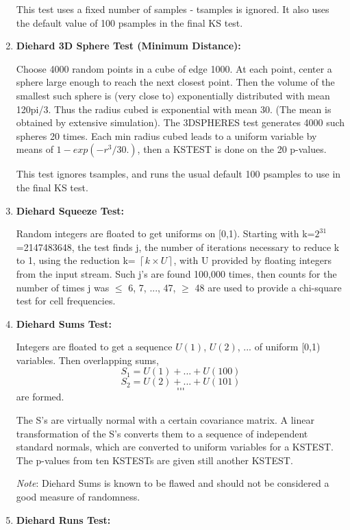\documentclass[titlepage, 11pt]{article}
\newcommand{\ceil}[1]{\left\lceil #1 \right\rceil}
\begin{document}
\begin{enumerate}
This test uses a fixed number of samples - tsamples is ignored.
It also uses the default value of 100 psamples in the final
KS test.


\item {\textbf{Diehard 3D Sphere Test (Minimum Distance):}}


Choose  4000 random points in a cube of edge 1000.  At each   
point, center a sphere large enough to reach the next closest 
point. Then the volume of the smallest such sphere is (very   
close to) exponentially distributed with mean 120pi/3.  Thus  
the radius cubed is exponential with mean 30. (The mean is    
obtained by extensive simulation).  The 3DSPHERES test generates 4000 such spheres 20 times.  Each min radius cubed leads 
to a uniform variable by means of $1-exp(-r^3/30.)$, then a     
 KSTEST is done on the 20 p-values.                           

 
This test ignores tsamples, and runs the usual default 100
psamples to use in the final KS test.


\item {\textbf{Diehard Squeeze Test:}}


Random integers are floated to get uniforms on [0,1). Starting with k=$2^{31}$=2147483648, the test finds j, the number of  
iterations necessary to reduce k to 1, using the reduction k= $\ceil{ k \times U }$, with U provided by floating integers from    
the input stream.  Such j's are found 100,000 times, then counts for the number of times j was $\leq$ 6, 7, ..., 47, $\geq$ 48 
are used to provide a chi-square test for cell frequencies.


\item {\textbf{Diehard Sums Test:}} 


Integers are floated to get a sequence $U(1)$, $U(2)$, ... of uniform [0,1) variables.  Then overlapping sums,     \\            
  $$S_1=U(1)+...+U(100)$$ $$S_2=U(2)+...+U(101)$$ $$...$$ $$...$$ are formed.


The S's are virtually normal with a certain covariance matrix. A linear transformation of the S's converts them to a   
sequence of independent standard normals, which are converted to uniform variables for a KSTEST. The  p-values from ten     
KSTESTs are given still another KSTEST.


\textit{Note}: Diehard Sums is known to be flawed and should not be considered a good measure of randomness.


\item {\textbf{Diehard Runs Test:}}



\end{enumerate}
\end{document}
